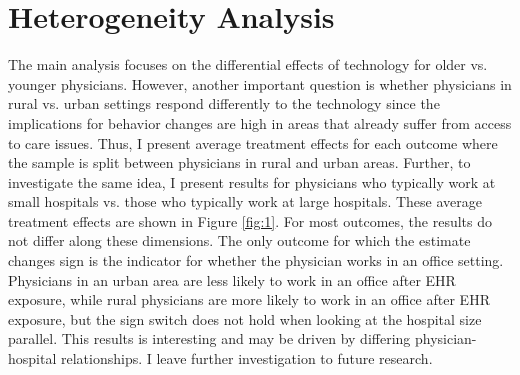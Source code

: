 \documentclass[12pt]{article}
\begin{document}
\section{Heterogeneity Analysis}

The main analysis focuses on the differential effects of technology for older vs. younger physicians. However, another important question is whether physicians in rural vs. urban settings respond differently to the technology since the implications for behavior changes are high in areas that already suffer from access to care issues. Thus, I present average treatment effects for each outcome where the sample is split between physicians in rural and urban areas. Further, to investigate the same idea, I present results for physicians who typically work at small hospitals vs. those who typically work at large hospitals. These average treatment effects are shown in Figure \ref{fig:1}. For most outcomes, the results do not differ along these dimensions. The only outcome for which the estimate changes sign is the indicator for whether the physician works in an office setting. Physicians in an urban area are less likely to work in an office after EHR exposure, while rural physicians are more likely to work in an office after EHR exposure, but the sign switch does not hold when looking at the hospital size parallel. This results is interesting and may be driven by differing physician-hospital relationships. I leave further investigation to future research. 
\end{document}
